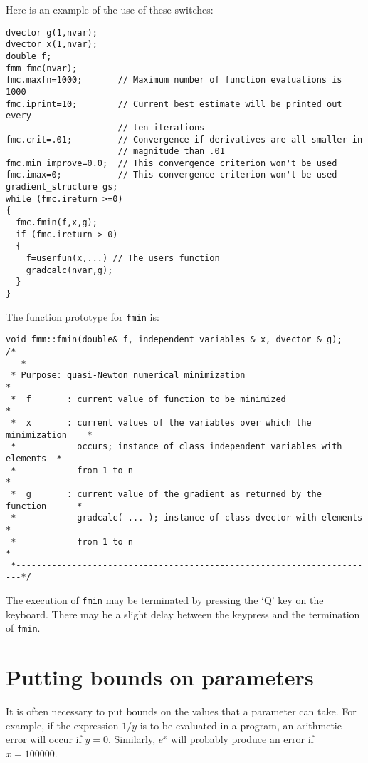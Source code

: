 \documentclass{admbmanual}
\begin{document}
Here is an example of the use of these switches:
\begin{lstlisting}
dvector g(1,nvar);
dvector x(1,nvar);
double f;
fmm fmc(nvar);
fmc.maxfn=1000;       // Maximum number of function evaluations is 1000
fmc.iprint=10;        // Current best estimate will be printed out every
                      // ten iterations
fmc.crit=.01;         // Convergence if derivatives are all smaller in 
                      // magnitude than .01
fmc.min_improve=0.0;  // This convergence criterion won't be used
fmc.imax=0;           // This convergence criterion won't be used
gradient_structure gs;  
while (fmc.ireturn >=0)
{
  fmc.fmin(f,x,g);
  if (fmc.ireturn > 0)
  { 
    f=userfun(x,...) // The users function
    gradcalc(nvar,g);
  }
}
\end{lstlisting}

The function prototype for \texttt{fmin} is:
\begin{lstlisting}
void fmm::fmin(double& f, independent_variables & x, dvector & g);
/*-----------------------------------------------------------------------*
 * Purpose: quasi-Newton numerical minimization                              *
 *  f       : current value of function to be minimized                      *
 *  x       : current values of the variables over which the minimization    *
 *            occurs; instance of class independent variables with elements  *
 *            from 1 to n                                                    *
 *  g       : current value of the gradient as returned by the function      *
 *            gradcalc( ... ); instance of class dvector with elements   *
 *            from 1 to n                                                         *
 *-----------------------------------------------------------------------*/ 
\end{lstlisting}

The execution of \texttt{fmin} may be terminated by pressing the `Q'
key on the keyboard. There may be a slight delay between the keypress
and the termination of \texttt{fmin}.


\section{Putting bounds on parameters}

It is often necessary to put bounds on the values that a parameter
can take. For example, if the expression $1/y$ is to be evaluated
in a program, an arithmetic error will occur if $y=0$.
Similarly, $e^x$ will probably produce an error if $x=100000$.
\end{document}

